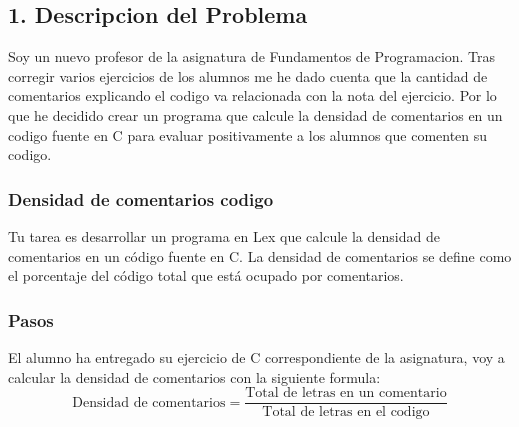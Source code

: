 \documentclass{article}
\begin{document}
        \newpage

        \subsection*{1. Descripcion del Problema}
        
        Soy un nuevo profesor de la asignatura de Fundamentos de Programacion. Tras corregir varios ejercicios de los alumnos me he dado cuenta que la cantidad de comentarios explicando 
        el codigo va relacionada con la nota del ejercicio. Por lo que he decidido crear un programa que calcule la densidad de comentarios en un codigo fuente en C para evaluar positivamente a los alumnos que comenten su codigo.
    
        \subsubsection*{Densidad de comentarios codigo}
        Tu tarea es desarrollar un programa en Lex que calcule la densidad de comentarios en un código fuente en C. 
        La densidad de comentarios se define como el porcentaje del código total que está ocupado por comentarios. 

        \subsubsection*{Pasos}
        El alumno ha entregado su ejercicio de C correspondiente de la asignatura, voy a calcular la densidad de comentarios con la siguiente formula: 
        \[ \text{{Densidad de comentarios}} = \frac{{\text{{Total de letras en un comentario}}}}{{\text{{Total de letras en el codigo}}}} \]
        
\end{document}
